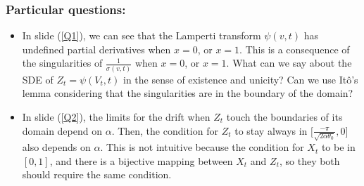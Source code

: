 \documentclass[aspectratio=169]{beamer}\usepackage[utf8]{inputenc}
\begin{document}
\begin{frame}\frametitle{Particular questions:}

\begin{itemize}

\item In slide ({\color{blue}\ref{Q1}}), we can see that the Lamperti transform $\psi(v,t)$ has undefined partial derivatives when $x=0$, or $x=1$. This is a consequence of the singularities of $\frac{1}{\sigma(v,t)}$ when $x=0$, or $x=1$. \alert{What can we say about the SDE of $Z_t=\psi(V_t,t)$ in the sense of existence and unicity? Can we use It\^o's lemma considering that the singularities are in the boundary of the domain?}
\item In slide ({\color{blue}\ref{Q2}}), the limits for the drift when $Z_t$ touch the boundaries of its domain depend on $\alpha$. Then, the condition for $Z_t$ to stay always in $\Big[\frac{-\pi}{\sqrt{2\alpha\theta_0}},0\Big]$ also depends on $\alpha$. \alert{This is not intuitive because the condition for $X_t$ to be in $[0,1]$, and there is a bijective mapping between $X_t$ and $Z_t$, so they both should require the same condition.}

\end{itemize}

\end{frame}
\end{document}
